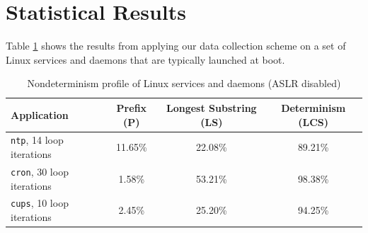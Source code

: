 

\section{Statistical Results} \label{bootresults}
Table \ref{hw:stats} shows the results from applying our data
collection scheme on a set of Linux services and daemons
that are typically launched at boot. 

\begin{table}[h]
\caption{Nondeterminism profile of Linux services and daemons (ASLR disabled)}
\label{hw:stats}
\begin{center}
\begin{tabular}{||l|c|c|c||}\hline
  Application & Prefix (P) & Longest Substring (LS) &
  Determinism (LCS) \\
  \hline \hline
  \texttt{ntp}, 14 loop iterations & 11.65\% & 22.08\% & 89.21\% \\\hline 
  \texttt{cron}, 30 loop iterations & 1.58\% & 53.21\% & 98.38\% \\\hline 
  \texttt{cups}, 10 loop iterations & 2.45\% & 25.20\% & 94.25\% \\\hline 
\end{tabular}
\end{center}
\end{table}

